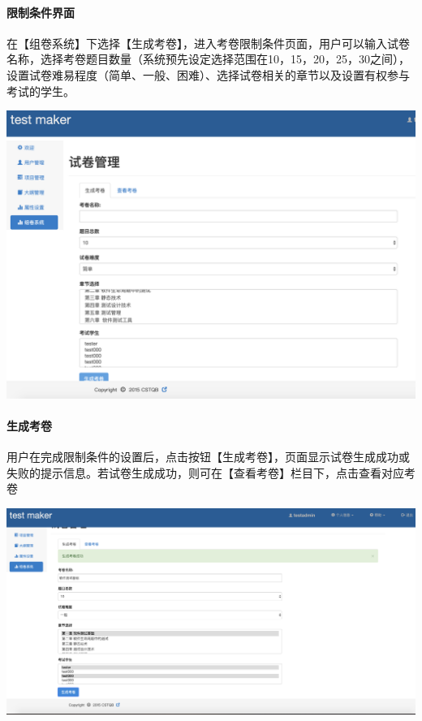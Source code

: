 \documentclass[hyperref, a4paper]{ctexart}
\let\oldparagraph\paragraph
\renewcommand{\paragraph}[1]{\oldparagraph{#1}\mbox{}}
\begin{document}
\hypertarget{ux9650ux5236ux6761ux4ef6ux754cux9762}{%
\paragraph{限制条件界面}\label{ux9650ux5236ux6761ux4ef6ux754cux9762}}

在【组卷系统】下选择【生成考卷】，进入考卷限制条件页面，用户可以输入试卷名称，选择考卷题目数量（系统预先设定选择范围在10，15，20，25，30之间），设置试卷难易程度（简单、一般、困难）、选择试卷相关的章节以及设置有权参与考试的学生。

\includegraphics{pics/page_generate_1.png}

\hypertarget{ux751fux6210ux8003ux5377}{%
\paragraph{生成考卷}\label{ux751fux6210ux8003ux5377}}

用户在完成限制条件的设置后，点击按钮【生成考卷】，页面显示试卷生成成功或失败的提示信息。若试卷生成成功，则可在【查看考卷】栏目下，点击查看对应考卷

\includegraphics{pics/page_generate_2.png}
\end{document}
